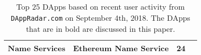 \begin{table}[t]
\begin{tabular}{|c|c|c|l|}
							
\multirow{1}{*}{Name Services}									& \cellcolor{LightGrey} \textbf{Ethereum Name Service} & 24  \\  \hline	
\end{tabular}
{\caption[Top 25 DApps on September 2021]{Top 25 DApps based on recent user activity from \texttt{DAppRadar.com} on September 4th, 2018. The DApps that are in bold are discussed in this paper.}\label{tab:top25DApps}}
\vspace{1em}
\end{table}

